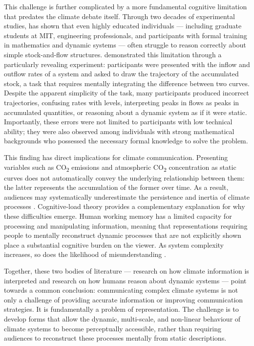 This challenge is further complicated by a more fundamental cognitive limitation that predates the climate debate itself. Through two decades of experimental studies, \citet{sterman2008} has shown that even highly educated individuals --- including graduate students at MIT, engineering professionals, and participants with formal training in mathematics and dynamic systems --- often struggle to reason correctly about simple stock-and-flow structures. \citet{cronin2009} demonstrated this limitation through a particularly revealing experiment: participants were presented with the inflow and outflow rates of a system and asked to draw the trajectory of the accumulated stock, a task that requires mentally integrating the difference between two curves. Despite the apparent simplicity of the task, many participants produced incorrect trajectories, confusing rates with levels, interpreting peaks in flows as peaks in accumulated quantities, or reasoning about a dynamic system as if it were static. Importantly, these errors were not limited to participants with low technical ability; they were also observed among individuals with strong mathematical backgrounds who possessed the necessary formal knowledge to solve the problem.

This finding has direct implications for climate communication. Presenting variables such as CO\textsubscript{2} emissions and atmospheric CO\textsubscript{2} concentration as static curves does not automatically convey the underlying relationship between them: the latter represents the accumulation of the former over time. As a result, audiences may systematically underestimate the persistence and inertia of climate processes \citep{sterman2008, cronin2009}. Cognitive-load theory provides a complementary explanation for why these difficulties emerge. Human working memory has a limited capacity for processing and manipulating information, meaning that representations requiring people to mentally reconstruct dynamic processes that are not explicitly shown place a substantial cognitive burden on the viewer. As system complexity increases, so does the likelihood of misunderstanding \citep{sweller1988, swellervanmerrienboer2019}.

Together, these two bodies of literature --- research on how climate information is interpreted and research on how humans reason about dynamic systems --- point towards a common conclusion: communicating complex climate systems is not only a challenge of providing accurate information or improving communication strategies. It is fundamentally a problem of representation. The challenge is to develop forms that allow the dynamic, multi-scale, and non-linear behaviour of climate systems to become perceptually accessible, rather than requiring audiences to reconstruct these processes mentally from static descriptions.


